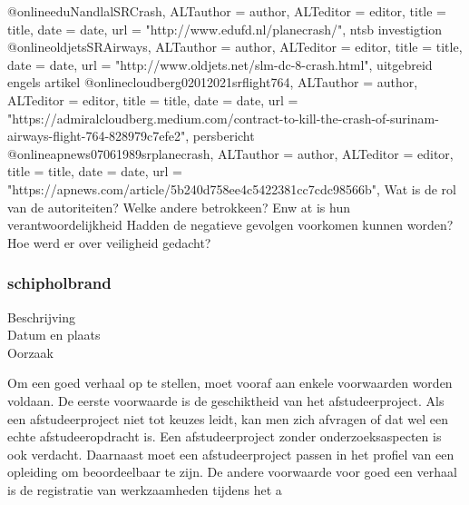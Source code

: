 {{{{{@online{eduNandlalSRCrash,	ALTauthor = {author},	ALTeditor = {editor},	title = {title},	date = {date},	url = {"http://www.edufd.nl/planecrash/"},}
ntsb investigtion
@online{oldjetsSRAirways,	ALTauthor = {author},	ALTeditor = {editor},	title = {title},	date = {date},	url = {"http://www.oldjets.net/slm-dc-8-crash.html"},}
uitgebreid engels artikel
@online{cloudberg02012021srflight764,	ALTauthor = {author},	ALTeditor = {editor},	title = {title},	date = {date},	url = {"https://admiralcloudberg.medium.com/contract-to-kill-the-crash-of-surinam-airways-flight-764-828979c7efe2"},}
persbericht
@online{apnews07061989srplanecrash,	ALTauthor = {author},	ALTeditor = {editor},	title = {title},	date = {date},	url = {"https://apnews.com/article/5b240d758ee4c5422381cc7cdc98566b"},}
Wat is de rol van de autoriteiten?
Welke andere betrokkeen? Enw at is hun verantwoordelijkheid
Hadden de negatieve gevolgen voorkomen kunnen worden?
Hoe werd er over veiligheid gedacht?



\subsubsection{schipholbrand}

	\begin{description}
	\item[Beschrijving]
	\item[Datum en plaats] 
	\item[Oorzaak]
\end{description}
Om een goed verhaal op te stellen, moet vooraf aan enkele voorwaarden
worden voldaan. De eerste voorwaarde is de geschiktheid van het
afstudeerproject. Als een afstudeerproject niet tot keuzes leidt, kan
men zich afvragen of dat wel een echte afstudeeropdracht is. Een
afstudeerproject zonder onderzoeksaspecten is ook verdacht. Daarnaast
moet een afstudeerproject passen in het profiel van een opleiding om
beoordeelbaar te zijn. De andere voorwaarde voor goed een verhaal is
de registratie van werkzaamheden tijdens het a


}}}}}
